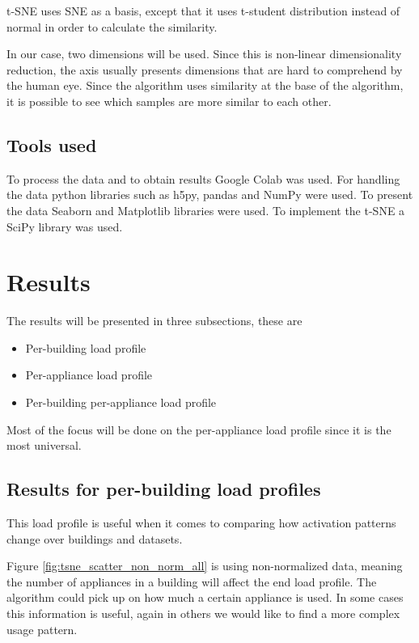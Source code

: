 t-SNE uses SNE as a basis, except that it uses t-student distribution instead of normal in order to calculate the similarity.

In our case, two dimensions will be used. Since this is non-linear dimensionality reduction,
the axis usually presents dimensions that are hard to comprehend by the human eye. 
Since the algorithm uses similarity at the base of the algorithm, it is possible to 
see which samples are more similar to each other.

\subsection{Tools used}

To process the data and to obtain results Google Colab was used.
For handling the data python libraries such as h5py, pandas and NumPy were used.
To present the data Seaborn and Matplotlib libraries were used.
To implement the t-SNE a SciPy library was used.

\section{Results}

The results will be presented in three subsections, these are

\begin{itemize}
	\item Per-building load profile
	\item Per-appliance load profile
	\item Per-building per-appliance load profile
\end{itemize}

Most of the focus will be done on the per-appliance load profile since it is the most universal.

\subsection{Results for per-building load profiles}

This load profile is useful when it comes to comparing how 
activation patterns change over buildings and datasets.

Figure \ref{fig:tsne_scatter_non_norm_all} is using non-normalized data, meaning
the number of appliances in a building will affect the end load profile.
The algorithm could pick up on how much a certain appliance is used.
In some cases this information is useful, 
again in others we would like to find a more complex usage pattern.

